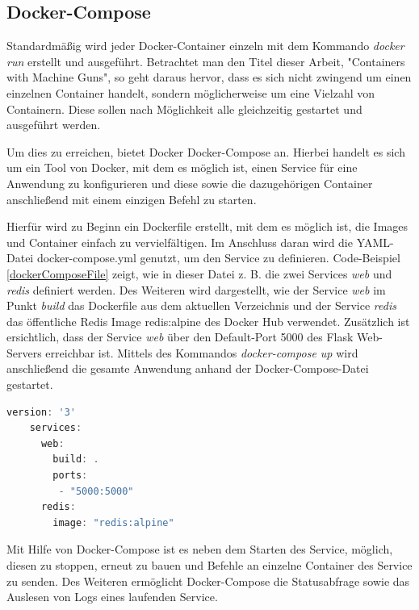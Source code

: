 \subsection{Docker-Compose}
\label{ss:dockerCompose}

Standardmäßig wird jeder Docker-Container einzeln mit dem Kommando \textit{docker run} erstellt und ausgeführt.
Betrachtet man den Titel dieser Arbeit, "Containers with Machine Guns", so geht daraus hervor, dass es sich nicht zwingend um einen einzelnen Container handelt, sondern möglicherweise um eine Vielzahl von Containern.
Diese sollen nach Möglichkeit alle gleichzeitig gestartet und ausgeführt werden.

Um dies zu erreichen, bietet Docker Docker-Compose an.
Hierbei handelt es sich um ein Tool von Docker, mit dem es möglich ist, einen Service für eine Anwendung zu konfigurieren und diese sowie die dazugehörigen Container anschließend mit einem einzigen Befehl zu starten.

Hierfür wird zu Beginn ein Dockerfile erstellt, mit dem es möglich ist, die Images und Container einfach zu vervielfältigen.
Im Anschluss daran wird die YAML-Datei docker-compose.yml genutzt, um den Service zu definieren.
Code-Beispiel \ref{dockerComposeFile} zeigt, wie in dieser Datei z. B. die zwei Services \textit{web} und \textit{redis} definiert werden.
Des Weiteren wird dargestellt, wie der Service \textit{web} im Punkt \textit{build} das Dockerfile aus dem aktuellen Verzeichnis und der Service \textit{redis} das öffentliche Redis Image \glqq{}redis:alpine\grqq{} des Docker Hub verwendet.
Zusätzlich ist ersichtlich, dass der Service \textit{web} über den Default-Port 5000 des Flask Web-Servers erreichbar ist.
Mittels des Kommandos \textit{docker-compose up} wird anschließend die gesamte Anwendung anhand der Docker-Compose-Datei gestartet.

\begin{minipage}{\linewidth}
	\begin{lstlisting}[frame=single,caption=Beispiel Docker Compose Datei \cite{Docker:online2}, label=dockerComposeFile, language=Scala]
	version: '3'
	services:
	  web:
	    build: .
	    ports:
	     - "5000:5000"
	  redis:
	    image: "redis:alpine"
	\end{lstlisting}
\end{minipage}

Mit Hilfe von Docker-Compose ist es neben dem Starten des Service, möglich, diesen zu stoppen, erneut zu bauen und Befehle an einzelne Container des Service zu senden.
Des Weiteren ermöglicht Docker-Compose die Statusabfrage sowie das Auslesen von Logs eines laufenden Service.

